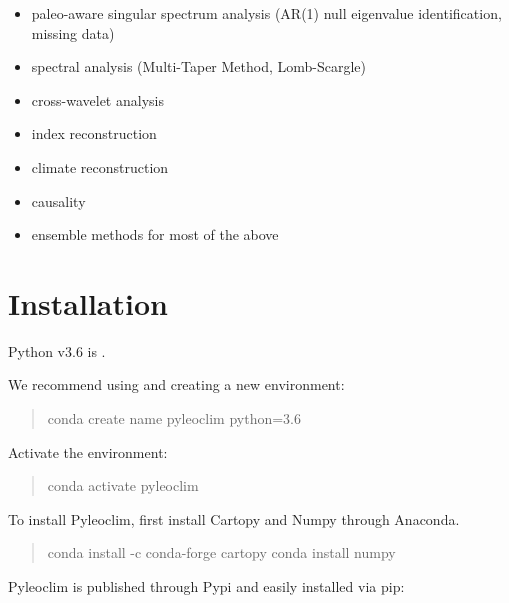 \documentclass[letterpaper,10pt,english]{sphinxmanual}
\begin{document}
\begin{itemize}
\item {} 
paleo-aware singular spectrum analysis (AR(1) null eigenvalue identification, missing data)

\item {} 
spectral analysis (Multi-Taper Method, Lomb-Scargle)

\item {} 
cross-wavelet analysis

\item {} 
index reconstruction

\item {} 
climate reconstruction

\item {} 
causality

\item {} 
ensemble methods for most of the above

\end{itemize}


\section{Installation}
\label{\detokenize{Introduction:installation}}
Python v3.6 is .

We recommend using  and creating a new environment:
\begin{quote}

conda create \textendash{}name pyleoclim python=3.6
\end{quote}

Activate the environment:
\begin{quote}

conda activate pyleoclim
\end{quote}

To install Pyleoclim, first install Cartopy and Numpy through Anaconda.
\begin{quote}

conda install -c conda-forge cartopy
conda install numpy
\end{quote}

Pyleoclim is published through Pypi and easily installed via pip:

\begin{sphinxVerbatim}[commandchars=\\\{\}]
  
\end{sphinxVerbatim}
\end{document}
